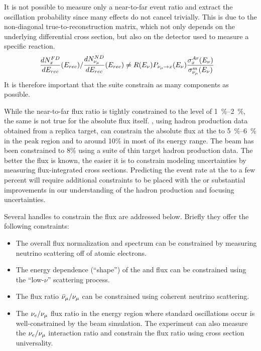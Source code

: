 It is not possible to measure only a near-to-far event ratio and extract the oscillation probability since many effects do not cancel trivially.  This is due to the non-diagonal true-to-reconstruction matrix, which not only depends on the underlying differential cross section, but also on the detector used to measure a specific reaction.
\begin{align}
\frac{dN^{FD}_{x}}{dE_{rec}}(E_{rec})/{\frac{dN^{ND}_{\nu_\mu}}{dE_{rec}}(E_{rec})} & \neq  R(E_\nu)P_{\nu_\mu\rightarrow x}(E_\nu)\frac{\sigma^{Ar}_x(E_\nu)}{\sigma^{m}_{\nu_\mu}(E_\nu)}
\end{align}
It is therefore important that the   suite constrain as many components as possible.


While the near-to-far flux ratio is tightly constrained to the level of \SIrange{1}{2}{\%}, the same is not true for the absolute flux itself. , using hadron production data obtained from a replica target, can constrain the absolute flux at the   to \SIrange{5}{6}{\%} in the peak region and to around 10\% in most of its energy range. The  beam has been constrained to 8\% using a suite of thin target hadron production data. The better the  flux is known, the easier it is to constrain modeling uncertainties by measuring flux-integrated cross sections. Predicting the event rate at the   to a few percent will require additional constraints to be placed with the   or substantial improvements in our understanding of the hadron production and focusing uncertainties. 

Several handles to constrain the flux %
are addressed below. Briefly they offer the following constraints:

\begin{itemize}
    \item The overall flux normalization and spectrum can be constrained by measuring neutrino scattering off of atomic electrons.
    \item The energy dependence (``shape'') of the \numu and \anumu %
     flux can be constrained using the ``low-$\nu$'' scattering process.
    \item The flux ratio $\bar\nu_\mu/\nu_\mu$ can be constrained using  coherent neutrino scattering.
    \item The $\nu_e/\nu_\mu$ flux ratio in the energy region where standard oscillations occur is well-constrained by the beam simulation. The experiment can also measure the $\nu_e/\nu_\mu$ interaction ratio and constrain the flux ratio using cross section universality.
\end{itemize}





